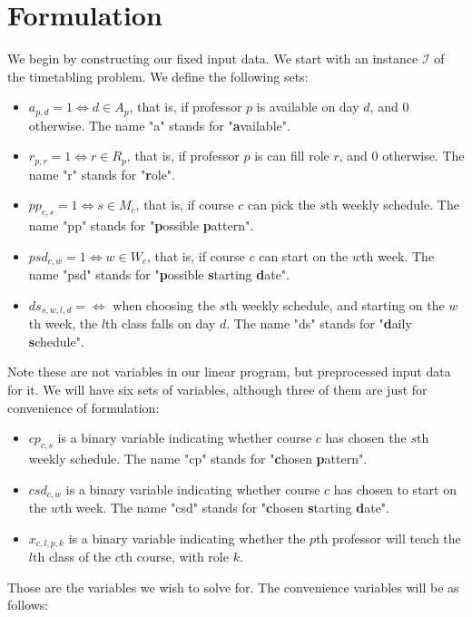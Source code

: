 \section{Formulation}
We begin by constructing our fixed input data. We start with an instance $\mathcal{I}$ of the timetabling problem. We define the following sets:

\begin{itemize}
  \item $a_{p, d} = 1 \iff d \in A_p$, that is, if professor $p$ is available on day $d$, and $0$ otherwise. The name "a" stands for "\textbf{a}vailable".
  \item $r_{p, r} = 1 \iff r \in R_p$, that is, if professor $p$ is can fill role $r$, and $0$ otherwise. The name "r" stands for "\textbf{r}ole".
  \item $pp_{c, s} = 1 \iff s \in M_c$, that is, if course $c$ can pick the $s$th weekly schedule. The name "pp" stands for "\textbf{p}ossible \textbf{p}attern".
  \item $psd_{c, w} = 1 \iff w \in W_c$, that is, if course $c$ can start on the $w$th week. The name "psd" stands for "\textbf{p}ossible \textbf{s}tarting \textbf{d}ate".
  \item $ds_{s, w, l, d} = \iff $ when choosing the $s$th weekly schedule, and starting on the $w$th week, the $l$th class falls on day $d$. The name "ds" stands for "\textbf{d}aily \textbf{s}chedule".
\end{itemize}

Note these are not variables in our linear program, but preprocessed input data for it. We will have six sets of variables, although three of them are just for convenience of formulation:

\begin{itemize}
  \item $cp_{c, s}$ is a binary variable indicating whether course $c$ has chosen the $s$th weekly schedule. The name "cp" stands for "\textbf{c}hosen \textbf{p}attern".
  \item $csd_{c, w}$ is a binary variable indicating whether course $c$ has chosen to start on the $w$th week. The name "csd" stands for "\textbf{c}hosen \textbf{s}tarting \textbf{d}ate".
  \item $x_{c, l, p, k}$ is a binary variable indicating whether the $p$th professor will teach the $l$th class of the $c$th course, with role $k$.
\end{itemize}

Those are the variables we wish to solve for. The convenience variables will be as follows:

